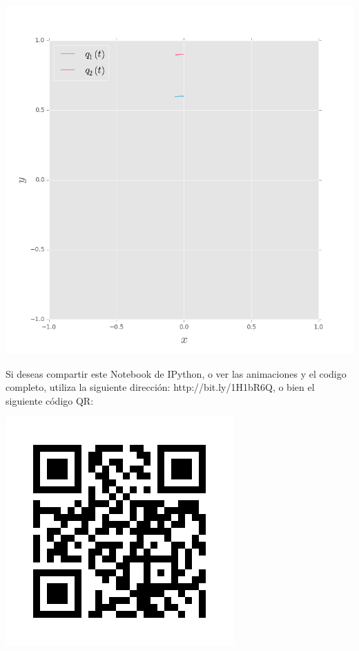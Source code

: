 \documentclass{article}
\begin{document}
\begin{center}
\includegraphics[width=0.5\linewidth]{./imagenes/xypendubotoptimo.png}
\end{center}
        
    Si deseas compartir este Notebook de IPython, o ver las animaciones y el codigo completo, utiliza la siguiente
dirección: http://bit.ly/1H1bR6Q, o bien el siguiente código QR:

\begin{center}
\includegraphics[width=0.2\linewidth]{codigos/pendubot.jpg}
\end{center}


    
    
    
    
\end{document}
